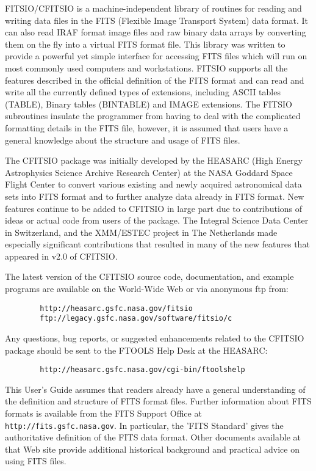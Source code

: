 \documentclass[11pt]{book}
\begin{document}
FITSIO/CFITSIO is a machine-independent library of routines for reading
and writing data files in the FITS (Flexible Image Transport System)
data format.  It can also read IRAF format image files and raw binary
data arrays by converting them on the fly into a virtual FITS format
file.  This library was written to provide a powerful yet simple
interface for accessing FITS files which will run on most commonly used
computers and workstations. FITSIO supports all the features described
in the official definition of the FITS format and can read and
write all the currently defined types of extensions, including ASCII
tables (TABLE), Binary tables (BINTABLE) and IMAGE extensions. The
FITSIO subroutines insulate the programmer from having to deal with the
complicated formatting details in the FITS file, however, it is assumed
that users have a general knowledge about the structure and usage of
FITS files.

The CFITSIO package was initially developed by the HEASARC (High Energy
Astrophysics Science Archive Research Center) at the NASA Goddard Space
Flight Center to convert various existing and newly acquired
astronomical data sets into FITS format and to further analyze data
already in FITS format.  New features continue to be added to CFITSIO
in large part due to contributions of ideas or actual code from users
of the package.  The Integral Science Data Center in Switzerland, and
the XMM/ESTEC project in The Netherlands made especially significant
contributions that resulted in many of the new features that appeared
in v2.0 of CFITSIO.

The latest version of the CFITSIO source code, documentation, and
example programs are available on the World-Wide Web or via anonymous
ftp from:

\begin{verbatim}
        http://heasarc.gsfc.nasa.gov/fitsio
        ftp://legacy.gsfc.nasa.gov/software/fitsio/c
\end{verbatim}
\newpage
Any questions, bug reports, or suggested enhancements related to the CFITSIO
package should be sent to the FTOOLS Help Desk at the HEASARC:

\begin{verbatim}
        http://heasarc.gsfc.nasa.gov/cgi-bin/ftoolshelp
\end{verbatim}

This User's Guide assumes that readers already have a general
understanding of the definition and structure of FITS format files.
Further information about FITS formats is available from the FITS Support
Office at {\tt http://fits.gsfc.nasa.gov}.  In particular, the
'FITS Standard' gives the authoritative definition of the FITS data
format.  Other documents available at that Web site
provide additional historical background
and practical advice on using FITS files.
\end{document}
